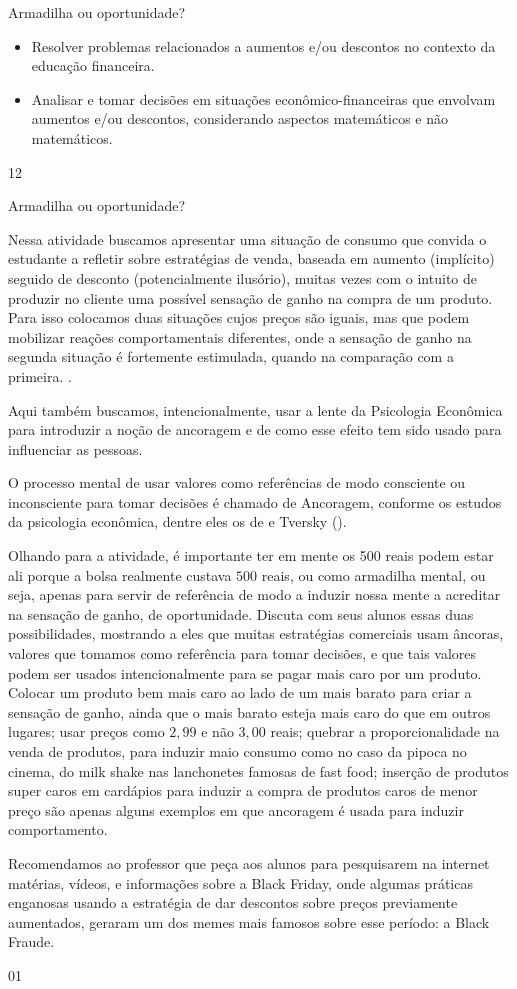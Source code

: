 \clearpage
\def\currentcolor{session2}
\begin{objectives}{Armadilha ou oportunidade?}
{
\begin{itemize}
\item Resolver problemas relacionados a aumentos e/ou descontos no contexto da educação financeira.
\item Analisar e tomar decisões em situações econômico-financeiras que envolvam aumentos e/ou descontos, considerando aspectos matemáticos e não matemáticos.
\end{itemize}
}{1}{2}
\end{objectives}
\begin{sugestions}{Armadilha ou oportunidade?}
{
Nessa atividade buscamos apresentar uma situação de consumo que convida o estudante a refletir sobre estratégias de venda, baseada em aumento (implícito) seguido de desconto (potencialmente ilusório), muitas vezes com o intuito de produzir no cliente uma possível sensação de ganho na compra de um produto. Para isso colocamos duas situações cujos preços são iguais, mas que podem mobilizar reações comportamentais diferentes, onde a sensação de ganho na segunda situação é fortemente estimulada, quando na comparação com a primeira. \citep{kahneman2012}.

Aqui também buscamos, intencionalmente, usar a lente da Psicologia Econômica para introduzir a noção de ancoragem e de como esse efeito tem sido usado para influenciar as pessoas. 

O processo mental de usar valores como referências de modo consciente ou inconsciente para tomar decisões é chamado de Ancoragem, conforme os estudos da psicologia econômica, dentre eles os de \citeauthor{kahneman2012} e Tversky (\citeyear{kahneman2012}).

Olhando para a atividade, é importante ter em mente os 500 reais podem estar ali porque a bolsa realmente custava $500$ reais, ou como armadilha mental, ou seja, apenas para servir de referência de modo a induzir nossa mente a acreditar na sensação de ganho, de oportunidade. 
Discuta com seus alunos essas duas possibilidades, mostrando a eles que muitas estratégias comerciais usam âncoras, valores que tomamos como referência para tomar decisões, e que tais valores podem ser usados intencionalmente para se pagar mais caro por um produto. Colocar um produto bem mais caro ao lado de um mais barato para criar a sensação de ganho, ainda que o mais barato esteja mais caro do que em outros lugares; usar preços como $2{,}99$ e não $3{,}00$ reais; quebrar a proporcionalidade na venda de produtos, para induzir maio consumo como no caso da pipoca no cinema, do milk shake nas lanchonetes famosas de fast food; inserção de produtos super caros em cardápios para induzir a compra de produtos caros de menor preço são apenas alguns exemplos em que ancoragem é usada para induzir comportamento. 

Recomendamos ao professor que peça aos alunos para pesquisarem na internet matérias, vídeos, e informações sobre a Black Friday, onde algumas práticas enganosas usando a estratégia de dar descontos sobre preços previamente aumentados, geraram um dos memes mais famosos sobre esse período: a Black Fraude. 

}{0}{1}
\end{sugestions}
